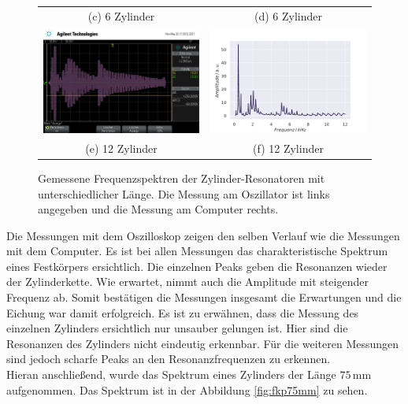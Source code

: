 \begin{figure}[H]
\begin{tabular}{cc}
    (c) 6 Zylinder & (d) 6 Zylinder \\[6pt]
    \includegraphics[width=65mm]{Daten/Zyinder/Zylinder_12.png} &   \includegraphics[width=65mm]{Daten/Zyinder/Zylinder_12.pdf} \\
    (e) 12 Zylinder & (f) 12 Zylinder \\[6pt]
    \end{tabular}
    \caption{Gemessene Frequenzspektren der Zylinder-Resonatoren mit unterschiedlicher Länge. Die Messung am Oszillator ist links angegeben und die Messung am Computer rechts. } 
    \label{fig:zyl1-6-12}
\end{figure}

Die Messungen mit dem Oszilloskop zeigen den selben Verlauf wie die Messungen mit dem Computer. Es ist bei allen Messungen das charakteristische Spektrum eines Festkörpers ersichtlich. Die einzelnen Peaks geben die Resonanzen wieder der Zylinderkette. Wie erwartet, nimmt auch die Amplitude mit steigender Frequenz ab. 
Somit bestätigen die Messungen insgesamt die Erwartungen und die Eichung war damit erfolgreich. 
Es ist zu erwähnen, dass die Messung des einzelnen Zylinders ersichtlich nur unsauber gelungen ist. Hier sind die Resonanzen des Zylinders nicht eindeutig erkennbar. Für die weiteren Messungen sind jedoch scharfe Peaks an den Resonanzfrequenzen zu erkennen. \\
Hieran anschließend, wurde das Spektrum eines Zylinders der Länge $75\,\si{\milli\metre}$ aufgenommen. Das Spektrum ist in der Abbildung \ref{fig:fkp75mm} zu sehen.


